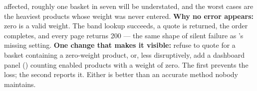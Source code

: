 \begin{ans}
        affected, roughly one basket in seven will be understated, and the
        worst cases are the heaviest products whose weight was never entered.
        \textbf{Why no error appears:} zero is a valid weight. The band lookup
        succeeds, a quote is returned, the order completes, and every page
        returns 200 --- the same shape of silent failure as
        's missing setting. \textbf{One change that makes it
        visible:} refuse to quote for a basket containing a zero-weight
        product, or, less disruptively, add a dashboard panel
        () counting enabled products with a weight of zero.
        The first prevents the loss; the second reports it. Either is better
        than an accurate method nobody maintains.
\end{ans}

